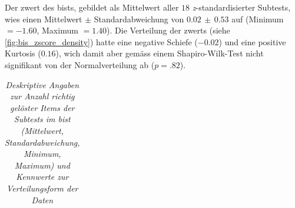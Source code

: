 \documentclass[11pt, twoside, a4paper]{book}		%
\begin{document}
Der \gls{zwert} des \gls{bist}s, gebildet als Mittelwert aller $18$ \textit{z}-stand\-ard\-isier\-ter Subtests, wies einen Mittelwert $\pm$ Standardabweichung von $0.02\,\pm\,0.53$ auf (Minimum $= -1.60$, Maximum $= 1.40$). Die Verteilung der \gls{zwert}s (siehe \autoref{fig:bis_zscore_density}) hatte eine negative Schiefe ($-0.02$) und eine positive Kurtosis ($0.16$), wich damit aber gemäss einem Shapiro-Wilk-Test  nicht signifikant von der Normalverteilung ab ($p=.82$).

\begin{table}[!t]
	\centering
	\captionsetup{labelsep = none}
	\caption[Deskriptive Angaben zur Anzahl richtig gelöster Items der Subtests im \gls{bist}]{\newline  \textit{Deskriptive Angaben zur Anzahl richtig gelöster Items der Subtests im \gls{bist} (Mittelwert, Standardabweichung, Minimum, Maximum) und Kennwerte zur Verteilungsform der Daten} \vspace{.2cm}}
	\label{tab:bis_descriptives}
	\begin{adjustbox}{width=.82\textwidth,keepaspectratio} %
	\begin{threeparttable}
		\begin{tabular}{
				l
				S[table-format = 2.2]
				S[table-format = 2.2]
				S[table-format = 1.0]
				S[table-format = 2.0]
				S[table-format = 1.2]
				S[table-format = 1.2]
				S[table-format = < 0.3, add-integer-zero=false]
				}
			\hline


\end{tabular}
\end{threeparttable}
\end{adjustbox}
\end{table}
\end{document}
